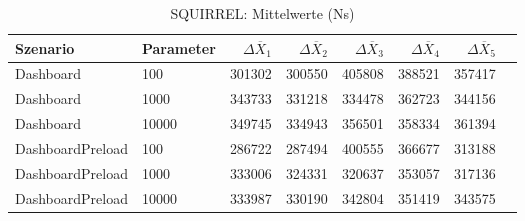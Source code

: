 
\begin{table}[ht]
\setlength{\extrarowheight}{-1pt}
\centering
\caption{SQUIRREL: Mittelwerte (Ns)}
\begin{tabular}{llrrrrrr}
\toprule
Szenario & Parameter & ${\Delta \overline{X}_1}$ & ${\Delta \overline{X}_2}$ & ${\Delta \overline{X}_3}$ & ${\Delta \overline{X}_4}$ & ${\Delta \overline{X}_5}$ \\
\midrule
	Dashboard & 100 & 301302 & 300550 & 405808 & 388521 & 357417 \\
	Dashboard & 1000 & 343733 & 331218 & 334478 & 362723 & 344156 \\
	Dashboard & 10000 & 349745 & 334943 & 356501 & 358334 & 361394 \\
	DashboardPreload & 100 & 286722 & 287494 & 400555 & 366677 & 313188 \\
	DashboardPreload & 1000 & 333006 & 324331 & 320637 & 353057 & 317136 \\
	DashboardPreload & 10000 & 333987 & 330190 & 342804 & 351419 & 343575 \\
\bottomrule
\end{tabular}
\label{tab:mittelwerte_squirrel_ns}
\end{table}
	